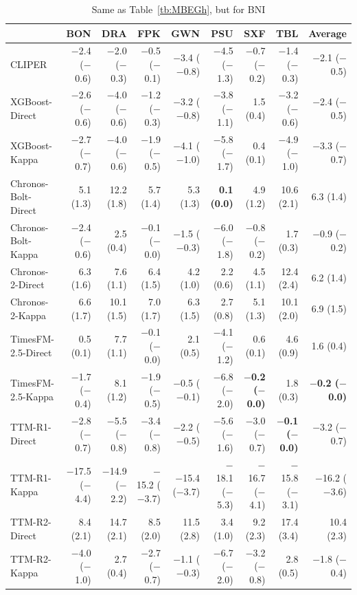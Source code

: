 \documentclass[number, 3p, 10pt, times]{elsarticle}
\begin{document}
\begin{table}[!ht]
\centering
\caption{Same as Table~\ref{tb:MBEGh}, but for BNI}
\label{tb:MBEBn}
\footnotesize
\begin{tabular}{lrrrrrrrr}
\toprule
 & BON & DRA & FPK & GWN & PSU & SXF & TBL & Average \\
\midrule
CLIPER & $-$2.4 ($-$0.6) & $-$2.0 ($-$0.3) & $-$0.5 ($-$0.1) & $-$3.4 ($-$0.8) & $-$4.5 ($-$1.3) & $-$0.7 ($-$0.2) & $-$1.4 ($-$0.3) & $-$2.1 ($-$0.5) \\
XGBoost-Direct & $-$2.6 ($-$0.6) & $-$4.0 ($-$0.6) & $-$1.2 ($-$0.3) & $-$3.2 ($-$0.8) & $-$3.8 ($-$1.1) & 1.5 (0.4) & $-$3.2 ($-$0.6) & $-$2.4 ($-$0.5) \\
XGBoost-Kappa & $-$2.7 ($-$0.7) & $-$4.0 ($-$0.6) & $-$1.9 ($-$0.5) & $-$4.1 ($-$1.0) & $-$5.8 ($-$1.7) & 0.4 (0.1) & $-$4.9 ($-$1.0) & $-$3.3 ($-$0.7) \\
Chronos-Bolt-Direct & 5.1 (1.3) & 12.2 (1.8) & 5.7 (1.4) & 5.3 (1.3) & \textbf{0.1 (0.0)} & 4.9 (1.2) & 10.6 (2.1) & 6.3 (1.4) \\
Chronos-Bolt-Kappa & $-$2.4 ($-$0.6) & 2.5 (0.4) & $-$0.1 ($-$0.0) & $-$1.5 ($-$0.3) & $-$6.0 ($-$1.8) & $-$0.8 ($-$0.2) & 1.7 (0.3) & $-$0.9 ($-$0.2) \\
Chronos-2-Direct & 6.3 (1.6) & 7.6 (1.1) & 6.4 (1.5) & 4.2 (1.0) & 2.2 (0.6) & 4.5 (1.1) & 12.4 (2.4) & 6.2 (1.4) \\
Chronos-2-Kappa & 6.6 (1.7) & 10.1 (1.5) & 7.0 (1.7) & 6.3 (1.5) & 2.7 (0.8) & 5.1 (1.3) & 10.1 (2.0) & 6.9 (1.5) \\
TimesFM-2.5-Direct & 0.5 (0.1) & 7.7 (1.1) & $-$0.1 ($-$0.0) & 2.1 (0.5) & $-$4.1 ($-$1.2) & 0.6 (0.1) & 4.6 (0.9) & 1.6 (0.4) \\
TimesFM-2.5-Kappa & $-$1.7 ($-$0.4) & 8.1 (1.2) & $-$1.9 ($-$0.5) & $-$0.5 ($-$0.1) & $-$6.8 ($-$2.0) & \textbf{$-$0.2 ($-$0.0)} & 1.8 (0.3) & \textbf{$-$0.2 ($-$0.0)} \\
TTM-R1-Direct & $-$2.8 ($-$0.7) & $-$5.5 ($-$0.8) & $-$3.4 ($-$0.8) & $-$2.2 ($-$0.5) & $-$5.6 ($-$1.6) & $-$3.0 ($-$0.7) & \textbf{$-$0.1 ($-$0.0)} & $-$3.2 ($-$0.7) \\
TTM-R1-Kappa & $-$17.5 ($-$4.4) & $-$14.9 ($-$2.2) & $-$15.2 ($-$3.7) & $-$15.4 ($-$3.7) & $-$18.1 ($-$5.3) & $-$16.7 ($-$4.1) & $-$15.8 ($-$3.1) & $-$16.2 ($-$3.6) \\
TTM-R2-Direct & 8.4 (2.1) & 14.7 (2.1) & 8.5 (2.0) & 11.5 (2.8) & 3.4 (1.0) & 9.2 (2.3) & 17.4 (3.4) & 10.4 (2.3) \\
TTM-R2-Kappa & $-$4.0 ($-$1.0) & 2.7 (0.4) & $-$2.7 ($-$0.7) & $-$1.1 ($-$0.3) & $-$6.7 ($-$2.0) & $-$3.2 ($-$0.8) & 2.8 (0.5) & $-$1.8 ($-$0.4) \\

\end{tabular}
\end{table}
\end{document}
